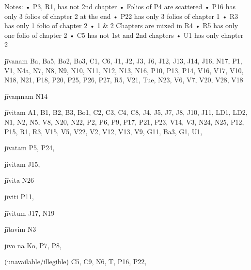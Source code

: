 Notes:
    • P3, R1, has not 2nd chapter
    • Folios of P4 are scattered 
    • P16 has only 3 folios of chapter 2 at the end
    • P22 has only 3 folios of chapter 1
    • R3 has only 1 folio of chapter 2
    • 1 & 2 Chapters are mixed in R4
    • R5 has only one folio of chapter 2
    • C5 has not 1st and 2nd chapters
    • U1 has only chapter 2
\begin{marma}[hp02_003]
\item[jīvanam] Ba, Ba5, Bo2, Bo3, C1, C6, J1, J2, J3, J6, J12, J13, J14, J16, N17, P1, V1, N4a, N7, N8, N9, N10, N11, N12, N13, N16, P10, P13, P14, V16, V17, V10, N18, N21, P18, P20, P25, P26, P27, R5, V21, Tue, N23, V6, V7, V20, V28, V18
\item[jīvaṃnam] N14
\item[jīvitam] A1, B1, B2, B3, Bo1, C2, C3, C4, C8, J4, J5, J7, J8, J10, J11, LD1, LD2, N1, N2, N5, V8, N20, N22, P2, P6, P9, P17, P21, P23, V14, V3, N24, N25, P12, P15, R1, R3, V15, V5, V22, V2, V12, V13, V9, G11, Ba3, G1, U1, 
\item[jīvatam] P5, P24,
\item[jivitam] J15,
\item[jīvita] N26
\item[jīviti] P11, 
\item[jīvitum] J17, N19
\item[jītavim] N3
\item[jīvo na] Ko, P7, P8, 
\item[(unavailable/illegible)] C5, C9, N6, T, P16, P22,

  \begin{description}

    \end{description}
 \end{marma}

